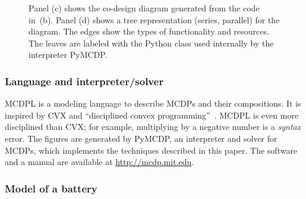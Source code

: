 \begin{figure}
\begin{centering}
{}\medskip{}
\par\end{centering}
\begin{centering}
\par\end{centering}
\medskip{}

\medskip{}

\caption{Panel (c) shows the co-design diagram generated from the code in~(b).
Panel (d) shows a tree representation (series, parallel) for the diagram.
The edges show the types of functionality and resources. The leaves
are labeled with the Python class used internally by the interpreter
PyMCDP. }
\end{figure}


\subsubsection{Language and interpreter/solver}

MCDPL is a modeling language to describe MCDPs and their compositions.
It is inspired by CVX and ``disciplined convex programming''~\cite{grant08graph}.
MCDPL is even more disciplined than CVX; for example, multiplying
by a negative number is a \emph{syntax} error. The figures are generated
by PyMCDP, an interpreter and solver for MCDPs, which implements the
techniques described in this paper.  The software and a manual are
available at \url{http://mcdp.mit.edu}. 

\subsubsection{Model of a battery}

